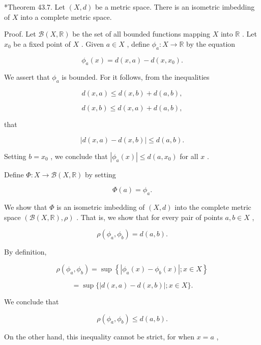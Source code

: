 \documentclass[10pt]{article}
\begin{document}
*Theorem 43.7. Let \(\left( {X,d}\right)\) be a metric space. There is an isometric imbedding of \(X\) into a complete metric space.

Proof. Let \(\mathcal{B}\left( {X,\mathbb{R}}\right)\) be the set of all bounded functions mapping \(X\) into \(\mathbb{R}\) . Let \({x}_{0}\) be a fixed point of \(X\) . Given \(a \in  X\) , define \({\phi }_{a} : X \rightarrow  \mathbb{R}\) by the equation

\[
{\phi }_{a}\left( x\right)  = d\left( {x,a}\right)  - d\left( {x,{x}_{0}}\right) .
\]

We assert that \({\phi }_{a}\) is bounded. For it follows, from the inequalities

\[
d\left( {x,a}\right)  \leq  d\left( {x,b}\right)  + d\left( {a,b}\right) ,
\]

\[
d\left( {x,b}\right)  \leq  d\left( {x,a}\right)  + d\left( {a,b}\right) ,
\]

that

\[
\left| {d\left( {x,a}\right)  - d\left( {x,b}\right) }\right|  \leq  d\left( {a,b}\right) .
\]

Setting \(b = {x}_{0}\) , we conclude that \(\left| {{\phi }_{a}\left( x\right) }\right|  \leq  d\left( {a,{x}_{0}}\right)\) for all \(x\) .

Define \(\Phi  : X \rightarrow  \mathcal{B}\left( {X,\mathbb{R}}\right)\) by setting

\[
\Phi \left( a\right)  = {\phi }_{a}.
\]

We show that \(\Phi\) is an isometric imbedding of \(\left( {X,d}\right)\) into the complete metric space \(\left( {\mathcal{B}\left( {X,\mathbb{R}}\right) ,\rho }\right)\) . That is, we show that for every pair of points \(a,b \in  X\) ,

\[
\rho \left( {{\phi }_{a},{\phi }_{b}}\right)  = d\left( {a,b}\right) .
\]

By definition,

\[
\rho \left( {{\phi }_{a},{\phi }_{b}}\right)  = \sup \left\{  {\left| {{\phi }_{a}\left( x\right)  - {\phi }_{b}\left( x\right) }\right| ;x \in  X}\right\}
\]

\[
= \sup \{ \left| {d\left( {x,a}\right)  - d\left( {x,b}\right) }\right| ;x \in  X\} .
\]

We conclude that

\[
\rho \left( {{\phi }_{a},{\phi }_{b}}\right)  \leq  d\left( {a,b}\right) .
\]

On the other hand, this inequality cannot be strict, for when \(x = a\) ,
\end{document}
